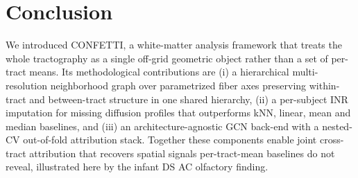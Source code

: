 \documentclass[runningheads]{llncs}
\begin{document}
\section{Conclusion}

We introduced CONFETTI, a white-matter analysis framework that treats the whole tractography as a single off-grid geometric object rather than a set of per-tract means. Its methodological contributions are (i) a hierarchical multi-resolution neighborhood graph over parametrized fiber axes preserving within-tract and between-tract structure in one shared hierarchy, (ii) a per-subject INR imputation for missing diffusion profiles that outperforms kNN, linear, mean and median baselines, and (iii) an architecture-agnostic GCN back-end with a nested-CV out-of-fold attribution stack. Together these components enable joint cross-tract attribution that recovers spatial signals per-tract-mean baselines do not reveal, illustrated here by the infant DS AC olfactory finding.
\end{document}
